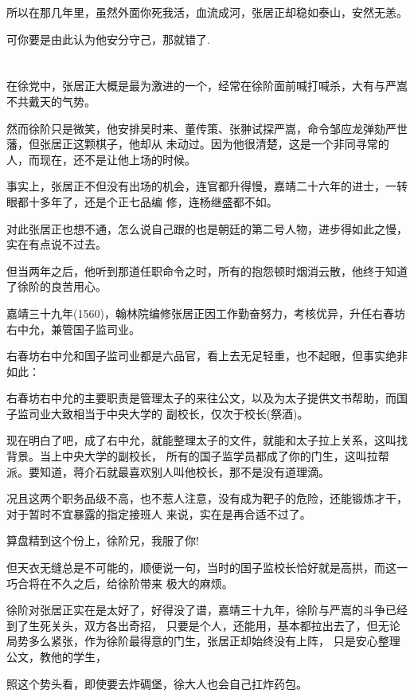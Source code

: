\documentclass[11pt,a4paper,onecolumn]{article}
\begin{document}
所以在那几年里，虽然外面你死我活，血流成河，张居正却稳如泰山，安然无恙。

可你要是由此认为他安分守己，那就错了.

\section[\thesection]{}

在徐党中，张居正大概是最为激进的一个，经常在徐阶面前喊打喊杀，大有与严嵩不共戴天的气势。

然而徐阶只是微笑，他安排吴时来、董传策、张翀试探严嵩，命令邹应龙弹劾严世藩，但张居正这颗棋子，他却从
未动过。因为他很清楚，这是一个非同寻常的人，而现在，还不是让他上场的时候。

事实上，张居正不但没有出场的机会，连官都升得慢，嘉靖二十六年的进士，一转眼都十多年了，还是个正七品编
修，连杨继盛都不如。

对此张居正也想不通，怎么说自己跟的也是朝廷的第二号人物，进步得如此之慢，实在有点说不过去。

但当两年之后，他听到那道任职命令之时，所有的抱怨顿时烟消云散，他终于知道了徐阶的良苦用心。

嘉靖三十九年(1560)，翰林院编修张居正因工作勤奋努力，考核优异，升任右春坊右中允，兼管国子监司业。

右春坊右中允和国子监司业都是六品官，看上去无足轻重，也不起眼，但事实绝非如此：

右春坊右中允的主要职责是管理太子的来往公文，以及为太子提供文书帮助，而国子监司业大致相当于中央大学的
副校长，仅次于校长(祭酒)。

现在明白了吧，成了右中允，就能整理太子的文件，就能和太子拉上关系，这叫找背景。当上中央大学的副校长，
所有的国子监学员都成了你的门生，这叫拉帮派。要知道，蒋介石就最喜欢别人叫他校长，那不是没有道理滴。

况且这两个职务品级不高，也不惹人注意，没有成为靶子的危险，还能锻炼才干，对于暂时不宜暴露的指定接班人
来说，实在是再合适不过了。

算盘精到这个份上，徐阶兄，我服了你!

但天衣无缝总是不可能的，顺便说一句，当时的国子监校长恰好就是高拱，而这一巧合将在不久之后，给徐阶带来
极大的麻烦。

徐阶对张居正实在是太好了，好得没了谱，嘉靖三十九年，徐阶与严嵩的斗争已经到了生死关头，双方各出奇招，
只要是个人，还能用，基本都拉出去了，但无论局势多么紧张，作为徐阶最得意的门生，张居正却始终没有上阵，
只是安心整理公文，教他的学生，

照这个势头看，即使要去炸碉堡，徐大人也会自己扛炸药包。
\end{document}
